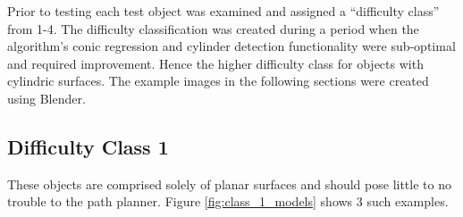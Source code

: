 Prior to testing each test object was examined and assigned a ``difficulty class'' from 1-4.
The difficulty classification was created during a period when the algorithm's conic regression and cylinder detection functionality were sub-optimal and required improvement.
Hence the higher difficulty class for objects with cylindric surfaces.
The example images in the following sections were created using Blender\cite{Blender}.

\subsection{Difficulty Class 1}
These objects are comprised solely of planar surfaces and should pose little to no trouble to the path planner.
Figure \ref{fig:class_1_models} shows 3 such examples.

